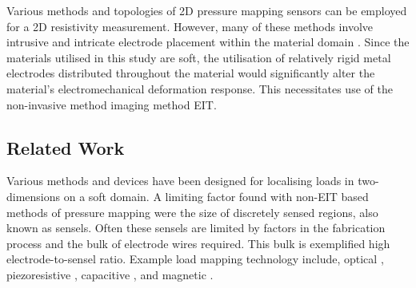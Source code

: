 
Various methods and topologies of 2D pressure mapping sensors can be employed for a 2D resistivity measurement. However, many of these methods involve intrusive and intricate electrode placement within the material domain \citep{Goncalves2017,Loew2019,Silvera-Tawil2015,Lee2019,Gilanizadehdizaj2022,Zhu2021}. Since the materials utilised in this study are soft, the utilisation of relatively rigid metal electrodes distributed throughout the material would significantly alter the material's electromechanical deformation response. This necessitates use of the non-invasive method imaging method EIT. 


\subsection{Related Work} \label{sec:Related Work}
Various methods and devices have been designed for localising loads in two-dimensions on a soft domain. A limiting factor found with non-EIT based methods of pressure mapping were the size of discretely sensed regions, also known as sensels. Often these sensels are limited by factors in the fabrication process and the bulk of electrode wires required. This bulk is exemplified high electrode-to-sensel ratio. Example load mapping technology include, optical \citep{Ramuz2012,Shimadera2022,Rossiter2005}, piezoresistive \citep{Gilanizadehdizaj2022,Fu2020,Yang2022}, capacitive \citep{Liang2015}, and magnetic \citep{Yan2021}.


